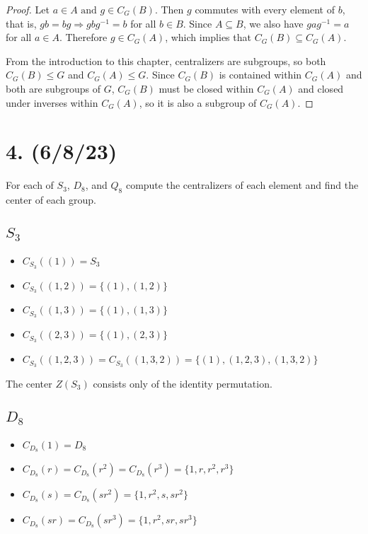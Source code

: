 \documentclass{article}
\begin{document}
\begin{proof}
    Let $a \in A \text{ and } g \in C_G(B)$. Then $g$ commutes with every element of $b$, that is, $gb = bg \Rightarrow gbg^{-1} = b$ for all $b \in B$. Since $A \subseteq B$, we also have $gag^{-1} = a$ for all $a \in A$. Therefore $g \in C_G(A)$, which implies that $C_G(B) \subseteq C_G(A)$.

    From the introduction to this chapter, centralizers are subgroups, so both $C_G(B) \leq G$ and $C_G(A) \leq G$. Since $C_G(B)$ is contained within $C_G(A)$ and both are subgroups of $G$, $C_G(B)$ must be closed within $C_G(A)$ and closed under inverses within $C_G(A)$, so it is also a subgroup of $C_G(A)$.
\end{proof}

\section*{4. (6/8/23)}

For each of $S_3$, $D_8$, and $Q_8$ compute the centralizers of each element and find the center of each group.

\subsection*{$S_3$}

\begin{itemize}
    \item $C_{S_3}((1)) = S_3$
    \item $C_{S_3}((1, 2)) = \{ (1), (1, 2) \}$
    \item $C_{S_3}((1, 3)) = \{ (1), (1, 3) \}$
    \item $C_{S_3}((2, 3)) = \{ (1), (2, 3) \}$
    \item $C_{S_3}((1, 2, 3)) = C_{S_3}((1, 3, 2)) = \{ (1), (1, 2, 3), (1, 3, 2) \}$
\end{itemize}

The center $Z(S_3)$ consists only of the identity permutation.

\subsection*{$D_8$}

\begin{itemize}
    \item $C_{D_8}(1) = D_8$
    \item $C_{D_8}(r) = C_{D_8}(r^2) = C_{D_8}(r^3) = \{ 1, r, r^2, r^3 \}$
    \item $C_{D_8}(s) = C_{D_8}(sr^2) = \{ 1, r^2, s, sr^2 \}$
    \item $C_{D_8}(sr) = C_{D_8}(sr^3) = \{ 1, r^2, sr, sr^3 \}$
\end{itemize}
\end{document}
